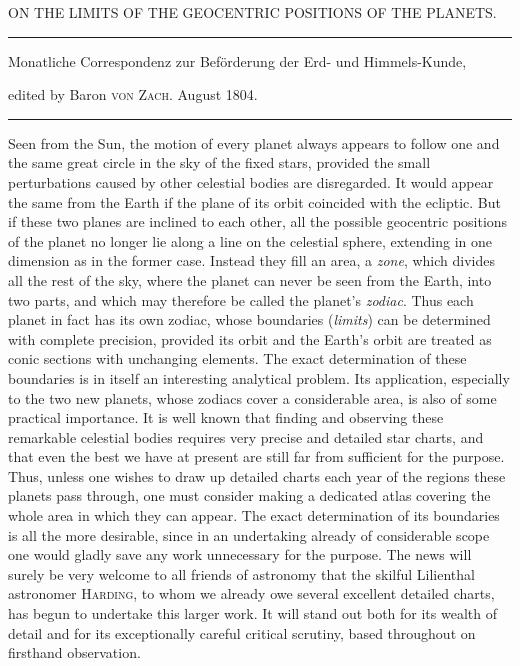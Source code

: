 \clearpage{}%
\begin{center}
{\small ON THE LIMITS OF THE GEOCENTRIC POSITIONS OF THE PLANETS.\par}
\medskip\hrule\medskip
{\small Monatliche Correspondenz zur Beförderung der Erd- und Himmels-Kunde,\par
edited by Baron \textsc{von Zach}. August 1804.\par}
\medskip\hrule
\end{center}\medskip
Seen from the Sun, the motion of every planet always appears to follow
one and the same great circle in the sky of the fixed stars, provided
the small perturbations caused by other celestial bodies are disregarded.
It would appear the same from the Earth if the plane of its orbit
coincided with the ecliptic. But if these two planes are inclined to
each other, all the possible geocentric positions of the planet no
longer lie along a line on the celestial sphere, extending in one
dimension as in the former case. Instead they fill an area, a
\textit{zone}, which divides all the rest of the sky, where the planet
can never be seen from the Earth, into two parts, and which may therefore
be called the planet’s \textit{zodiac}. Thus each planet in fact has its
own zodiac, whose boundaries (\textit{limits}) can be determined with
complete precision, provided its orbit and the Earth’s orbit are treated
as conic sections with unchanging elements. The exact determination of
these boundaries is in itself an interesting analytical problem. Its
application, especially to the two new planets, whose zodiacs cover a
considerable area, is also of some practical importance. It is well known
that finding and observing these remarkable celestial bodies requires
very precise and detailed star charts, and that even the best we have
%
at present are still far from sufficient for the purpose. Thus, unless
one wishes to draw up detailed charts each year of the regions these
planets pass through, one must consider making a dedicated atlas covering
the whole area in which they can appear. The exact determination of its
boundaries is all the more desirable, since in an undertaking already
of considerable scope one would gladly save any work unnecessary for
the purpose. The news will surely be very welcome to all friends of
astronomy that the skilful Lilienthal astronomer \textsc{Harding}, to
whom we already owe several excellent detailed charts, has begun to
undertake this larger work. It will stand out both for its wealth of
detail and for its exceptionally careful critical scrutiny, based
throughout on firsthand observation.

